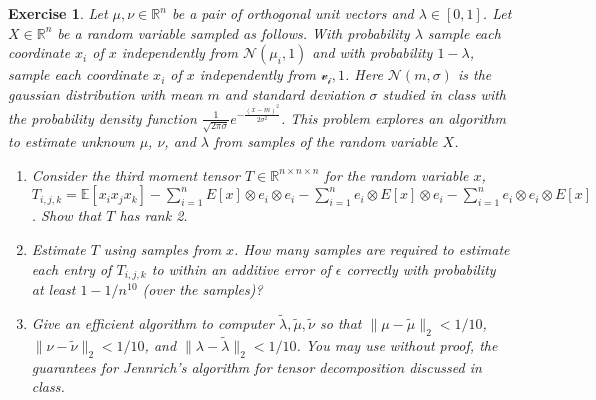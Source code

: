 \documentclass[12pt]{article}
\theoremstyle{colon}
\newtheorem{exercise}{Exercise}
\begin{document}
\begin{exercise}
  Let $\mu, \nu \in \mathbb{R}^n$ be a pair of orthogonal unit vectors and $\lambda \in [0,1]$. Let $X \in \mathbb{R}^n$ be a random variable sampled as follows. With probability $\lambda$ sample each coordinate $x_i$ of $x$ independently from $\mathcal{N}(\mu_i, 1)$ and with probability $1-\lambda$, sample each coordinate $x_i$ of $x$ independently from $\mathcal{v_i, 1}$. Here $\mathcal{N}(m, \sigma)$ is the gaussian distribution with mean $m$ and standard deviation $\sigma$ studied in class with the probability density function $\frac{1}{\sqrt{2 \pi \sigma}} e^{-\frac{(x-m)^2}{2 \sigma^2}}$. This problem explores an algorithm to estimate unknown $\mu$, $\nu$, and $\lambda$ from samples of the random variable $X$.
  \begin{enumerate}[label=\arabic*)]
    \item Consider the third moment tensor $T \in \mathbb{R}^{n \times n \times n}$ for the random variable $x$, $T_{i,j,k} = \mathbb{E}[x_i x_j x_k] - \sum_{i=1}^n E[x] \otimes e_i \otimes e_i - \sum_{i=1}^n e_i \otimes E[x] \otimes e_i - \sum_{i=1}^n  e_i \otimes e_i \otimes E[x]$. Show that $T$ has rank 2.

    \item Estimate $T$ using samples from $x$. How many samples are required to estimate each entry of $T_{i,j,k}$ to within an additive error of $\epsilon$ correctly with probability at least $1-1/n^10$ (over the samples)?

    \item Give an efficient algorithm to computer $\tilde{\lambda}, \tilde{\mu}, \tilde{\nu}$ so that $\lVert \mu - \tilde{\mu} \rVert_2 < 1/10$, $\lVert \nu - \tilde{\nu} \rVert_2 < 1/10$, and $\lVert \lambda - \tilde{\lambda} \rVert_2 < 1/10$. You may use without proof, the guarantees for Jennrich's algorithm for tensor decomposition discussed in class.
  \end{enumerate}
\end{exercise}
\end{document}
